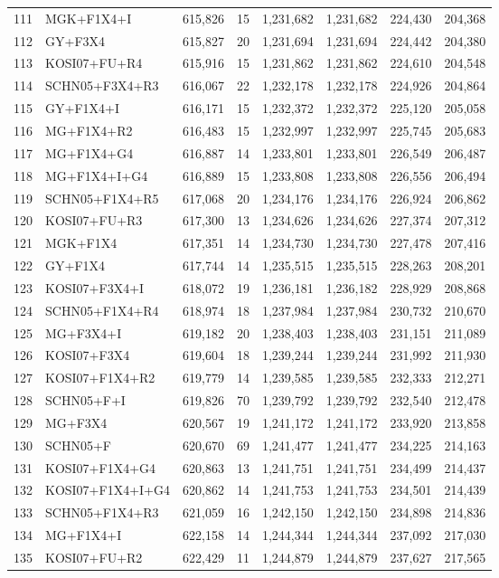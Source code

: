 \begin{longtable}{rlrrrrrr}
111&MGK+F1X4+I&615,826&15&1,231,682&1,231,682&224,430&204,368\\
112&GY+F3X4&615,827&20&1,231,694&1,231,694&224,442&204,380\\
113&KOSI07+FU+R4&615,916&15&1,231,862&1,231,862&224,610&204,548\\
114&SCHN05+F3X4+R3&616,067&22&1,232,178&1,232,178&224,926&204,864\\
115&GY+F1X4+I&616,171&15&1,232,372&1,232,372&225,120&205,058\\
116&MG+F1X4+R2&616,483&15&1,232,997&1,232,997&225,745&205,683\\
117&MG+F1X4+G4&616,887&14&1,233,801&1,233,801&226,549&206,487\\
118&MG+F1X4+I+G4&616,889&15&1,233,808&1,233,808&226,556&206,494\\
119&SCHN05+F1X4+R5&617,068&20&1,234,176&1,234,176&226,924&206,862\\
120&KOSI07+FU+R3&617,300&13&1,234,626&1,234,626&227,374&207,312\\
121&MGK+F1X4&617,351&14&1,234,730&1,234,730&227,478&207,416\\
122&GY+F1X4&617,744&14&1,235,515&1,235,515&228,263&208,201\\
123&KOSI07+F3X4+I&618,072&19&1,236,181&1,236,182&228,929&208,868\\
124&SCHN05+F1X4+R4&618,974&18&1,237,984&1,237,984&230,732&210,670\\
125&MG+F3X4+I&619,182&20&1,238,403&1,238,403&231,151&211,089\\
126&KOSI07+F3X4&619,604&18&1,239,244&1,239,244&231,992&211,930\\
127&KOSI07+F1X4+R2&619,779&14&1,239,585&1,239,585&232,333&212,271\\
128&SCHN05+F+I&619,826&70&1,239,792&1,239,792&232,540&212,478\\
129&MG+F3X4&620,567&19&1,241,172&1,241,172&233,920&213,858\\
130&SCHN05+F&620,670&69&1,241,477&1,241,477&234,225&214,163\\
131&KOSI07+F1X4+G4&620,863&13&1,241,751&1,241,751&234,499&214,437\\
132&KOSI07+F1X4+I+G4&620,862&14&1,241,753&1,241,753&234,501&214,439\\
133&SCHN05+F1X4+R3&621,059&16&1,242,150&1,242,150&234,898&214,836\\
134&MG+F1X4+I&622,158&14&1,244,344&1,244,344&237,092&217,030\\
135&KOSI07+FU+R2&622,429&11&1,244,879&1,244,879&237,627&217,565\\

\end{longtable}
